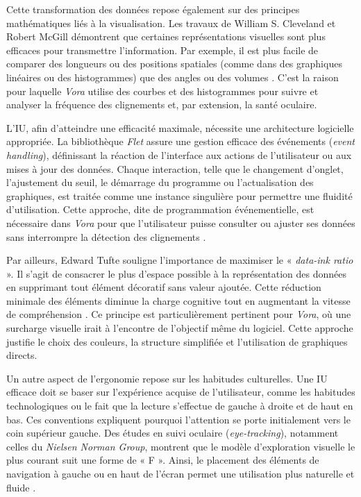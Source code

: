 \documentclass{rapportbrebeuf}
\begin{document}
Cette transformation des données repose également sur des principes mathématiques liés à la visualisation. Les travaux de William S. Cleveland et Robert McGill démontrent que certaines représentations visuelles sont plus efficaces pour transmettre l’information. Par exemple, il est plus facile de comparer des longueurs ou des positions spatiales (comme dans des graphiques linéaires ou des histogrammes) que des angles ou des volumes \cite{cleveland1985graphical}. C’est la raison pour laquelle \textit{Vora} utilise des courbes et des histogrammes pour suivre et analyser la fréquence des clignements et, par extension, la santé oculaire.

L’IU, afin d’atteindre une efficacité maximale, nécessite une architecture logicielle appropriée. La bibliothèque \textit{Flet} assure une gestion efficace des événements (\textit{event handling}), définissant la réaction de l'interface aux actions de l'utilisateur ou aux mises à jour des données. Chaque interaction, telle que le changement d’onglet, l’ajustement du seuil, le démarrage du programme ou l’actualisation des graphiques, est traitée comme une instance singulière pour permettre une fluidité d’utilisation. Cette approche, dite de programmation événementielle, est nécessaire dans \textit{Vora} pour que l'utilisateur puisse consulter ou ajuster ses données sans interrompre la détection des clignements \cite{mdn_events_2026}.

Par ailleurs, Edward Tufte souligne l’importance de maximiser le « \textit{data-ink ratio} ». Il s'agit de consacrer le plus d’espace possible à la représentation des données en supprimant tout élément décoratif sans valeur ajoutée. Cette réduction minimale des éléments diminue la charge cognitive tout en augmentant la vitesse de compréhension \cite{tufte2001visual}. Ce principe est particulièrement pertinent pour \textit{Vora}, où une surcharge visuelle irait à l’encontre de l’objectif même du logiciel. Cette approche justifie le choix des couleurs, la structure simplifiée et l'utilisation de graphiques directs.

Un autre aspect de l’ergonomie repose sur les habitudes culturelles. Une IU efficace doit se baser sur l’expérience acquise de l’utilisateur, comme les habitudes technologiques ou le fait que la lecture s’effectue de gauche à droite et de haut en bas. Ces conventions expliquent pourquoi l’attention se porte initialement vers le coin supérieur gauche. Des études en suivi oculaire (\textit{eye-tracking}), notamment celles du \textit{Nielsen Norman Group}, montrent que le modèle d’exploration visuelle le plus courant suit une forme de « F ». Ainsi, le placement des éléments de navigation à gauche ou en haut de l’écran permet une utilisation plus naturelle et fluide \cite{nielsen_fpattern_2017}.
\end{document}
